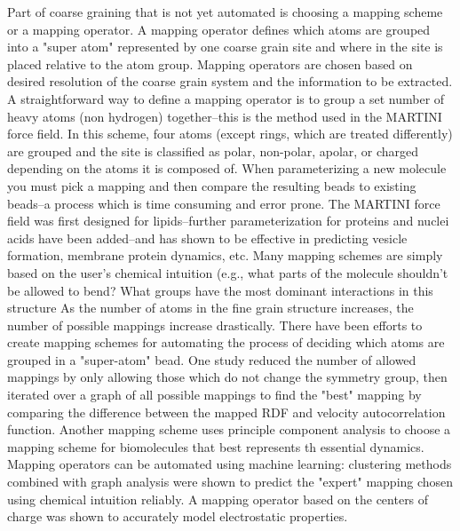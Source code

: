 Part of coarse graining that is not yet automated is choosing a mapping scheme or a mapping operator.
A mapping operator defines which atoms are grouped into a "super atom" represented by one coarse grain site and where in the site is placed relative to the atom group.
Mapping operators are chosen based on desired resolution of the coarse grain system and the information to be extracted.
A straightforward way to define a mapping operator is to group a set number of heavy atoms (non hydrogen) together--this is the method used in the MARTINI force field\cite{Marrink2007}.
In this scheme, four atoms (except rings, which are treated differently) are grouped and the site is classified as polar, non-polar, apolar, or charged depending on the atoms it is composed of.
When parameterizing a new molecule you must pick a mapping and then compare the resulting beads to existing beads--a process which is time consuming and error prone\cite{martini-tutorial}.
The MARTINI force field was first designed for lipids--further parameterization for proteins and nuclei acids have been added--and has shown to be effective in predicting vesicle formation, membrane protein dynamics, etc.%
Many mapping schemes are simply based on the user's chemical intuition (e.g., what parts of the molecule shouldn't be allowed to bend? What groups have the most dominant interactions in this structure %
As the number of atoms in the fine grain structure increases, the number of possible mappings increase drastically.
There have been efforts to create mapping schemes for automating the process of deciding which atoms are grouped in a "super-atom" bead.
One study reduced the number of allowed mappings by only allowing those which do not change the symmetry group, then iterated over a graph of all possible mappings to find the "best" mapping by comparing the difference between the mapped RDF and velocity autocorrelation function\cite{Chakraborty2018a}.
Another mapping scheme uses principle component analysis to choose a mapping scheme for biomolecules that best represents th essential dynamics\cite{Zhang2008}.
Mapping operators can be automated using machine learning: clustering methods combined with graph analysis were shown to predict the "expert" mapping chosen using chemical intuition reliably\cite{Li2020}. 
A mapping operator based on the centers of charge was shown to accurately model electrostatic properties\cite{Cao2015a}.

